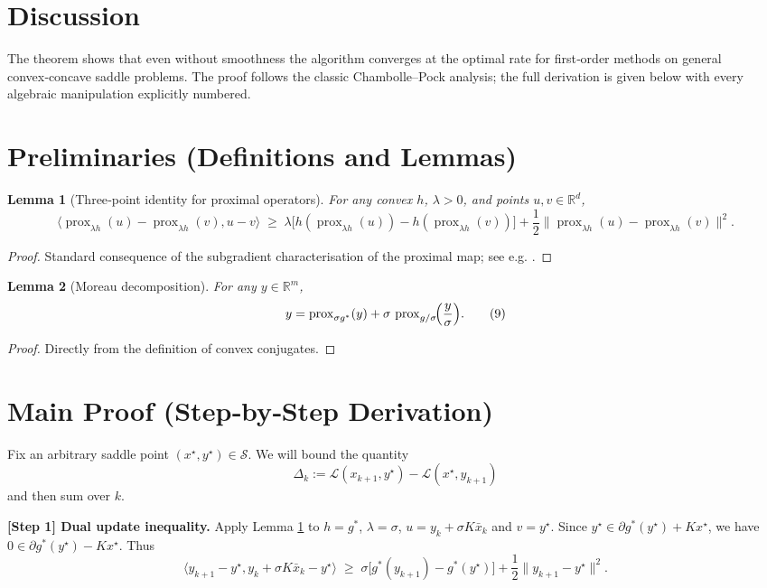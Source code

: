 \documentclass{article}
\newtheorem{lemma}{Lemma}
\newcommand{\prox}{\operatorname{prox}}
\newcommand{\inner}[2]{\langle #1,#2\rangle}
\newcommand{\norm}[1]{\|#1\|}
\newcommand{\R}{\mathbb{R}}
\begin{document}
\section*{Discussion}
The theorem shows that even without smoothness the algorithm converges at the optimal rate for first‑order methods on general convex‑concave saddle problems. The proof follows the classic Chambolle–Pock analysis; the full derivation is given below with every algebraic manipulation explicitly numbered.

\newpage
\section*{Preliminaries (Definitions and Lemmas)}
\begin{lemma}[Three‑point identity for proximal operators]\label{lem:three}
For any convex $h$, $\lambda>0$, and points $u,v\in\R^{d}$,
\[
\inner{ \prox_{\lambda h}(u)-\prox_{\lambda h}(v)}{u-v}
\;\ge\;
\lambda\bigl[ h(\prox_{\lambda h}(u))-h(\prox_{\lambda h}(v))\bigr]
+\frac{1}{2}\norm{\prox_{\lambda h}(u)-\prox_{\lambda h}(v)}^{2}.
\tag{8}
\]
\end{lemma}
\begin{proof}
Standard consequence of the subgradient characterisation of the proximal map; see e.g. \cite{Combettes2011}.
\end{proof}

\begin{lemma}[Moreau decomposition]\label{lem:moreau}
For any $y\in\R^{m}$,
\[
y = \prox_{\sigma g^{*}}(y) + \sigma\,\prox_{g/\sigma}\!\Bigl(\frac{y}{\sigma}\Bigr).
\tag{9}
\]
\end{lemma}
\begin{proof}
Directly from the definition of convex conjugates.
\end{proof}

\section*{Main Proof (Step‑by‑Step Derivation)}
Fix an arbitrary saddle point $(x^{\star},y^{\star})\in\mathcal S$.  
We will bound the quantity  
\[
\Delta_{k}:=
\mathcal L(x_{k+1},y^{\star})-\mathcal L(x^{\star},y_{k+1})
\tag{10}
\]
and then sum over $k$.

\bigskip
\noindent\textbf{[Step 1] Dual update inequality.}  
Apply Lemma \ref{lem:three} to $h=g^{*}$, $\lambda=\sigma$, $u=y_{k}+ \sigma K\bar x_{k}$ and $v=y^{\star}$.  
Since $y^{\star}\in\partial g^{*}(y^{\star})+Kx^{\star}$, we have $0\in\partial g^{*}(y^{\star})-Kx^{\star}$.  
Thus
\[
\inner{y_{k+1}-y^{\star}}{y_{k}+ \sigma K\bar x_{k} - y^{\star}}
\;\ge\;
\sigma\bigl[g^{*}(y_{k+1})-g^{*}(y^{\star})\bigr]
+\frac{1}{2}\norm{y_{k+1}-y^{\star}}^{2}.
\tag{11}
\]
\end{document}
